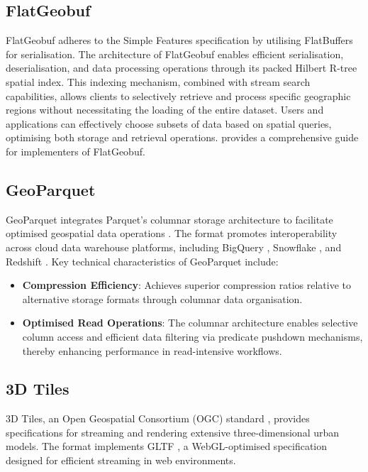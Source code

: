 \subsection{FlatGeobuf}
\label{rw:cloud_optimised_implementations:flatgeobuf}
FlatGeobuf adheres to the Simple Features \citet{simple_features} specification by utilising FlatBuffers \citep{flatbuffers} for serialisation.
The architecture of FlatGeobuf enables efficient serialisation, deserialisation, and data processing operations through its packed Hilbert R-tree spatial index.
This indexing mechanism, combined with stream search capabilities, allows clients to selectively retrieve and process specific geographic regions without necessitating the loading of the entire dataset.
Users and applications can effectively choose subsets of data based on spatial queries, optimising both storage and retrieval operations.
\citet{horance_2022_detail} provides a comprehensive guide for implementers of FlatGeobuf.

\subsection{GeoParquet}
\label{rw:cloud_optimised_implementations:geoparquet}
GeoParquet integrates Parquet's columnar storage architecture to facilitate optimised geospatial data operations \citep{geoparquet}. The format promotes interoperability across cloud data warehouse platforms, including BigQuery \citep{bigquery}, Snowflake \citep{snowflake}, and Redshift \citep{redshift}. Key technical characteristics of GeoParquet include:

\begin{itemize}
  \item \textbf{Compression Efficiency}: Achieves superior compression ratios relative to alternative storage formats through columnar data organisation.
  \item \textbf{Optimised Read Operations}: The columnar architecture enables selective column access and efficient data filtering via predicate pushdown mechanisms, thereby enhancing performance in read-intensive workflows.
\end{itemize}

\subsection{3D Tiles}
\label{rw:cloud_optimised_implementations:3d_tiles}
3D Tiles, an Open Geospatial Consortium (OGC) standard \citep{3d_tiles}, provides specifications for streaming and rendering extensive three-dimensional urban models. The format implements GLTF \citep{gltf}, a WebGL-optimised specification designed for efficient streaming in web environments.

